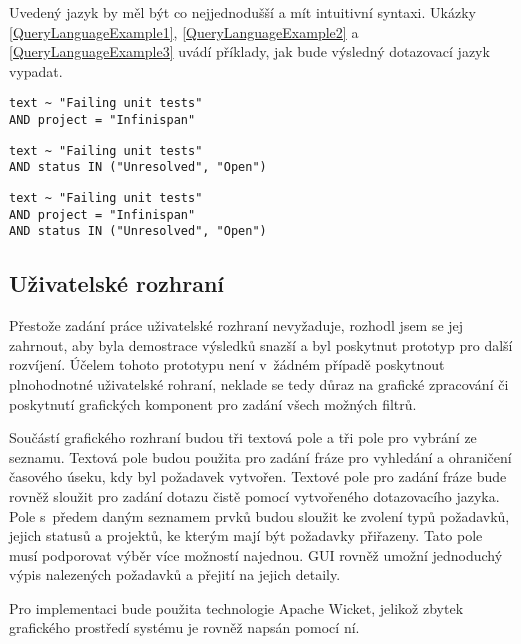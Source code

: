 \documentclass[11pt,oneside]{fithesis2}
\begin{document}
Uvedený jazyk by měl být co nejjednodušší a mít intuitivní syntaxi. Ukázky \ref{QueryLanguageExample1}, \ref{QueryLanguageExample2} a \ref{QueryLanguageExample3} uvádí příklady, jak bude výsledný dotazovací jazyk vypadat.

\begin{lstlisting}[caption =  Vyhledání fráze {\uv{Failing unit tests}} pouze u projektu {\uv{Infinispan}}, label = QueryLanguageExample1]
text ~ "Failing unit tests"
AND project = "Infinispan"
\end{lstlisting}

\begin{lstlisting}[caption =  Vyhledání fráze {\uv{Failing unit tests}} u požadavků se statusem {\uv{Unresolved}} nebo \uv{Open}, label = QueryLanguageExample2]
text ~ "Failing unit tests" 
AND status IN ("Unresolved", "Open")
\end{lstlisting}

\begin{lstlisting}[caption =  Kombinace dotazů {\ref{QueryLanguageExample1}} a {\ref{QueryLanguageExample2}}, label = QueryLanguageExample3]
text ~ "Failing unit tests" 
AND project = "Infinispan" 
AND status IN ("Unresolved", "Open")
\end{lstlisting}

\subsection{Uživatelské rozhraní}
Přestože zadání práce uživatelské rozhraní nevyžaduje, rozhodl jsem se jej zahrnout, aby byla demostrace výsledků snazší a byl poskytnut prototyp pro další rozvíjení. Účelem tohoto prototypu není v~žádném případě poskytnout plnohodnotné uživatelské rohraní, neklade se tedy důraz na grafické zpracování či poskytnutí grafických komponent pro zadání všech možných filtrů.

Součástí grafického rozhraní budou tři textová pole a tři pole pro vybrání ze seznamu. Textová pole budou použita pro zadání fráze pro vyhledání a ohraničení časového úseku, kdy byl požadavek vytvořen. Textové pole pro zadání fráze bude rovněž sloužit pro zadání dotazu čistě pomocí vytvořeného dotazovacího jazyka. Pole s~předem daným seznamem prvků budou sloužit ke zvolení typů požadavků, jejich statusů a projektů, ke kterým mají být požadavky přiřazeny. Tato pole musí podporovat výběr více možností najednou. GUI rovněž umožní jednoduchý výpis nalezených požadavků a přejití na jejich detaily. 

Pro implementaci bude použita technologie Apache Wicket, jelikož zbytek grafického prostředí systému je rovněž napsán pomocí ní. 
\end{document}
